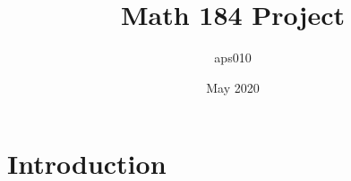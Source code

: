 \documentclass{article}
\title{Math 184 Project}
\author{aps010 }
\date{May 2020}
\begin{document}
\maketitle

\section{Introduction}
\end{document}
